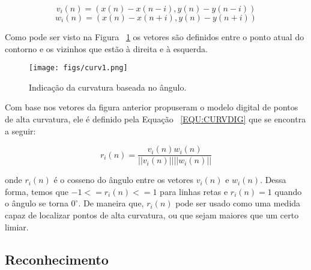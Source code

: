 \begin{equation}
v_{i}(n) = (x(n) - x(n-i), y(n) - y(n-i))
\label{EQU:VETCURV1}
\end{equation}
\begin{equation}
w_{i}(n) = (x(n) - x(n+i), y(n) - y(n+i))
\label{EQU:VETCURV2}
\end{equation} 

Como pode ser visto na Figura ~\ref{FIG:CURV1} os vetores s\~{a}o definidos entre o ponto atual do contorno e os vizinhos que est\~{a}o \`{a} direita e \`{a} esquerda.

\begin{figure}[h]
\centering
\texttt{[image: figs/curv1.png]}
\caption{Indica\c{c}\~{a}o da curvatura baseada no \^{a}ngulo.} \label{FIG:CURV1}
\end{figure}

Com base nos vetores da figura anterior \citet{JOHNSTON:1973} propuseram o modelo digital de pontos de alta curvatura, ele \'{e} definido pela Equa\c{c}\~{a}o ~\ref{EQU:CURVDIG} que se encontra a seguir:

\begin{equation}
r_{i}(n) = \frac{v_{i}(n)w_{i}(n)}{||v_{i}(n)||||w_{i}(n)||}
\label{EQU:CURVDIG}
\end{equation}

onde $r_i(n)$ \'{e} o cosseno do \^{a}ngulo entre os vetores $v_i(n)$ e $w_i(n)$. Dessa forma, temos que $-1 <= r_i(n) <= 1$ para linhas retas e $r_i(n) = 1$ quando o \^{a}ngulo se torna $0^\circ$. De maneira que, $r_i(n)$ pode ser usado como uma medida capaz de localizar pontos de alta curvatura, ou que sejam maiores que um certo limiar.


\subsection{Reconhecimento}




